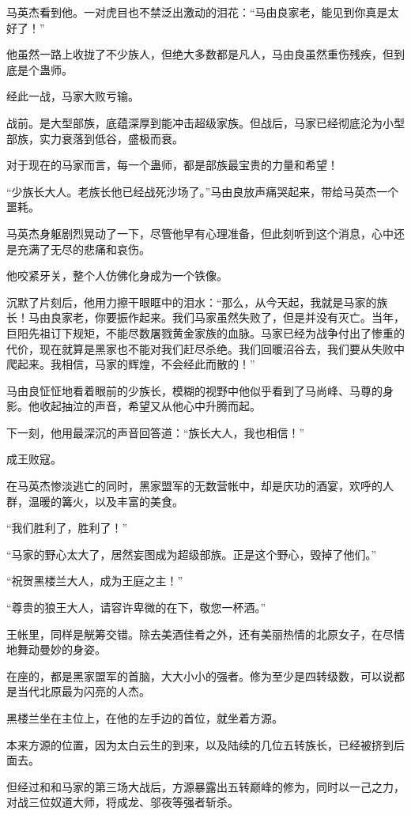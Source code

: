 \begin{this_body}
马英杰看到他。一对虎目也不禁泛出激动的泪花：“马由良家老，能见到你真是太好了！”

他虽然一路上收拢了不少族人，但绝大多数都是凡人，马由良虽然重伤残疾，但到底是个蛊师。

经此一战，马家大败亏输。

战前。是大型部族，底蕴深厚到能冲击超级家族。但战后，马家已经彻底沦为小型部族，实力衰落到低谷，盛极而衰。

对于现在的马家而言，每一个蛊师，都是部族最宝贵的力量和希望！

“少族长大人。老族长他已经战死沙场了。”马由良放声痛哭起来，带给马英杰一个噩耗。

马英杰身躯剧烈晃动了一下，尽管他早有心理准备，但此刻听到这个消息，心中还是充满了无尽的悲痛和哀伤。

他咬紧牙关，整个人仿佛化身成为一个铁像。

沉默了片刻后，他用力擦干眼眶中的泪水：“那么，从今天起，我就是马家的族长！马由良家老，你要振作起来。我们马家虽然失败了，但是并没有灭亡。当年，巨阳先祖订下规矩，不能尽数屠戮黄金家族的血脉。马家已经为战争付出了惨重的代价，现在就算是黑家也不能对我们赶尽杀绝。我们回暖沼谷去，我们要从失败中爬起来。我相信，马家的辉煌，不会经此而散的！”

马由良怔怔地看着眼前的少族长，模糊的视野中他似乎看到了马尚峰、马尊的身影。他收起抽泣的声音，希望又从他心中升腾而起。

下一刻，他用最深沉的声音回答道：“族长大人，我也相信！”

成王败寇。

在马英杰惨淡逃亡的同时，黑家盟军的无数营帐中，却是庆功的酒宴，欢呼的人群，温暖的篝火，以及丰富的美食。

“我们胜利了，胜利了！”

“马家的野心太大了，居然妄图成为超级部族。正是这个野心，毁掉了他们。”

“祝贺黑楼兰大人，成为王庭之主！”

“尊贵的狼王大人，请容许卑微的在下，敬您一杯酒。”

王帐里，同样是觥筹交错。除去美酒佳肴之外，还有美丽热情的北原女子，在尽情地舞动曼妙的身姿。

在座的，都是黑家盟军的首脑，大大小小的强者。修为至少是四转级数，可以说都是当代北原最为闪亮的人杰。

黑楼兰坐在主位上，在他的左手边的首位，就坐着方源。

本来方源的位置，因为太白云生的到来，以及陆续的几位五转族长，已经被挤到后面去。

但经过和和马家的第三场大战后，方源暴露出五转巅峰的修为，同时以一己之力，对战三位奴道大师，将成龙、邬夜等强者斩杀。


\end{this_body}
